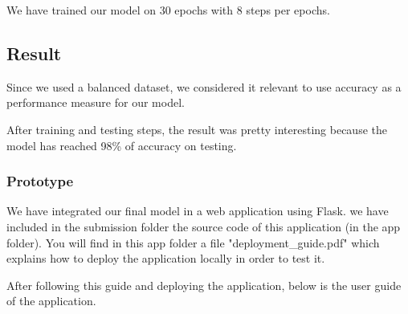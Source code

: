 \documentclass[a4paper, 12pt]{report}
\begin{document}
We have trained our model on 30 epochs with 8 steps per epochs.

\subsection{Result}

Since we used a balanced dataset, we considered it relevant to use accuracy as a performance measure for our model.

After training and testing steps, the result was pretty interesting because the model has reached 98\% of accuracy on testing.

\subsubsection{Prototype}

We have integrated our final model in a web application using Flask. we have included in the submission folder the source code of this application (in the app folder). You will find in this app folder a file "deployment\_guide.pdf" which explains how to deploy the application locally in order to test it.

After following this guide and deploying the application, below is the user guide of the application.
\end{document}
